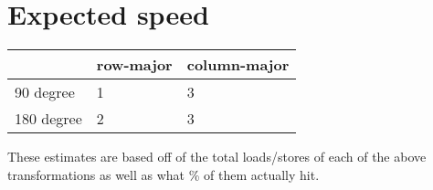 \documentclass[12pt, letterpaper]{article}
\begin{document}
\section*{Expected speed}

\begin{center}
    \begin{tabular}{ l l l }
        \hline
        & row-major & column-major \\
        \hline
        90 degree & 1 & 3 \\  
        180 degree & 2 & 3  \\
        \hline
    \end{tabular}
\end{center}
These estimates are based off of the total loads/stores of each of the above transformations
as well as what \% of them actually hit.
\end{document}
